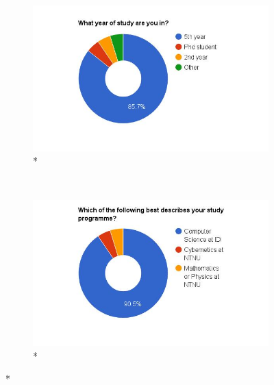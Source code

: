 \begin{figure}
    \centering
    \begin{subfigure}[h]{0.48\textwidth}
        \centerline{\includegraphics[width=1.5\textwidth]{results/year_of_study.jpg}}
        \caption{*}
        \label{fig:year-of-study}
    \end{subfigure}
    ~ %
    \hfill
    \begin{subfigure}[h]{0.48\textwidth}
        \centerline{\includegraphics[width=1.5\textwidth]{results/study_programme.jpg}}
        \caption{*}
        \label{fig:study-programme}
    \end{subfigure}


\end{figure}
